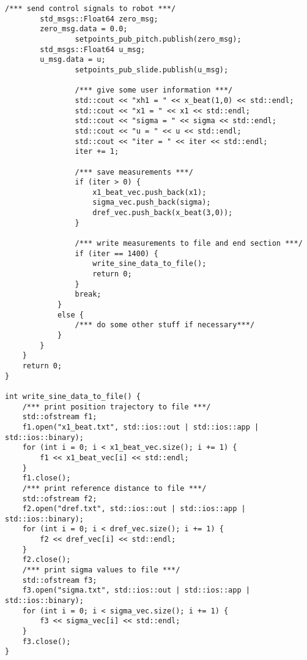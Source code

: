 \begin{lstlisting}[language=gedit]
                /*** send control signals to robot ***/
		std_msgs::Float64 zero_msg;
		zero_msg.data = 0.0;
                setpoints_pub_pitch.publish(zero_msg);
		std_msgs::Float64 u_msg;
		u_msg.data = u;
                setpoints_pub_slide.publish(u_msg);

                /*** give some user information ***/
                std::cout << "xh1 = " << x_beat(1,0) << std::endl;
                std::cout << "x1 = " << x1 << std::endl;
                std::cout << "sigma = " << sigma << std::endl;
                std::cout << "u = " << u << std::endl;
                std::cout << "iter = " << iter << std::endl;               
                iter += 1;

                /*** save measurements ***/
                if (iter > 0) {
                    x1_beat_vec.push_back(x1);
                    sigma_vec.push_back(sigma);
                    dref_vec.push_back(x_beat(3,0));
                }

                /*** write measurements to file and end section ***/
                if (iter == 1400) {
                    write_sine_data_to_file();
                    return 0;
                }
                break;
            }
            else {
                /*** do some other stuff if necessary***/
            }
        }
    }
    return 0;
}

int write_sine_data_to_file() {
    /*** print position trajectory to file ***/
    std::ofstream f1;
    f1.open("x1_beat.txt", std::ios::out | std::ios::app | std::ios::binary);
    for (int i = 0; i < x1_beat_vec.size(); i += 1) {
        f1 << x1_beat_vec[i] << std::endl;
    }
    f1.close();
    /*** print reference distance to file ***/
    std::ofstream f2;
    f2.open("dref.txt", std::ios::out | std::ios::app | std::ios::binary);
    for (int i = 0; i < dref_vec.size(); i += 1) {
        f2 << dref_vec[i] << std::endl;
    }
    f2.close();
    /*** print sigma values to file ***/
    std::ofstream f3;
    f3.open("sigma.txt", std::ios::out | std::ios::app | std::ios::binary);
    for (int i = 0; i < sigma_vec.size(); i += 1) {
        f3 << sigma_vec[i] << std::endl;
    }
    f3.close();
}


\end{lstlisting}
